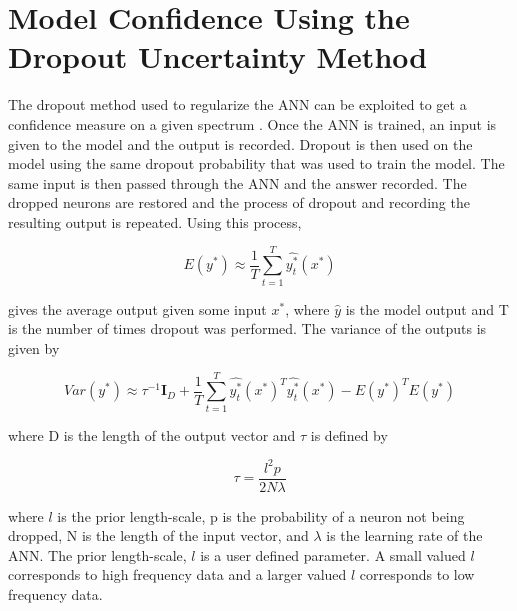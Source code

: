 \documentclass[tocnosub,noragright,centerchapter,12pt,fullpage]{uiucecethesis09}
\begin{document}

\iffalse
\section{Model Confidence Using the Dropout Uncertainty Method} \label{ModelConfidence}

The dropout method used to regularize the ANN can be exploited to get a confidence measure on a given spectrum \cite{Yarin2016}. Once the ANN is trained, an input is given to the model and the output is recorded. Dropout is then used on the model using the same dropout probability that was used to train the model. The same input is then passed through the ANN and the answer recorded. The dropped neurons are restored and the process of dropout and recording the resulting output is repeated. Using this process, 

\begin{equation} \label{eq:update1}
E (y^{*}) \approx \frac{1}{T} \sum^{T}_{t=1} \hat{y^{*}_t} (x^{*})
\end{equation}

gives the average output given some input $x^{*}$, where $\hat{y}$ is the model output and T is the number of times dropout was performed. The variance of the outputs is given by 


\begin{equation} \label{eq:update1}
Var (y^{*}) \approx \tau^{-1} \boldsymbol{I}_D + \frac{1}{T} \sum^{T}_{t=1} \hat{y^{*}_t} (x^{*})^{T} \hat{y^{*}_t}(x^{*}) - E(y^{*})^{T}E(y^{*})
\end{equation}

where D is the length of the output vector and $\tau$ is defined by 

\begin{equation} \label{eq:update1}
\tau = \frac{l^2 p }{2 N \lambda}
\end{equation}

where $l$ is the prior length-scale, p is the probability of a neuron not being dropped, N is the length of the input vector, and $\lambda$ is the learning rate of the ANN. The prior length-scale, $l$ is a user defined parameter. A small valued $l$ corresponds to high frequency data and a larger valued $l$ corresponds to low frequency data. 
\end{document}

